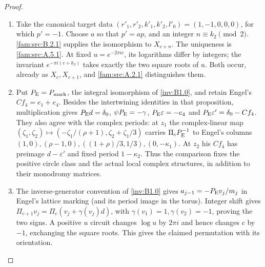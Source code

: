 \begin{proof}
\begin{enumerate}[label=\arabic*.,leftmargin=*]
\item Take the canonical target data $(r'_1,r'_2,k'_1,k'_2,l'_0)=(1,-1,0,0,0)$, for which $p'=-1$. Choose $a$ so that $p'=ap$, and an integer $n\equiv k_2\pmod2$. \ref{fam:src:B.2.1} supplies the isomorphism to $X_{c+n}$. The uniqueness is \ref{fam:src:A.5.1}. At fixed $u=e^{-2\pi ic}$, its logarithms differ by integers; the invariant $e^{-\pi i(c+k_2)}$ takes exactly the two square roots of $u$. Both occur, already as $X_c,X_{c+1}$, and \ref{fam:src:A.2.1} distinguishes them.

\item Put $P_{\rm E}=P_{\rm mark}$, the integral isomorphism of
\cref{inv:B1.0}, and retain Engel's $Cf_4=e_1+e_4$.
Besides the intertwining identities in that proposition, multiplication gives
$P_{\rm E}d=\delta_0$, $\psi P_{\rm E}=-\gamma$,
$P_{\rm E}\varepsilon=-e_4$ and
$P_{\rm E}\varepsilon'=\delta_0-Cf_4$.
They also agree with the complex periods: at $z_1$ the complex-linear map
$(\zeta_1,\zeta_2)\mapsto(-\zeta_1/(\rho+1),\zeta_2+\zeta_1/3)$ carries $\Pi_cP_{\rm E}^{-1}$ to Engel's columns $(1,0),(\rho-1,0),((1+\rho)/3,1/3),(0,-\kappa_1)$. At $z_2$ his $Cf_4$ has preimage $d-\varepsilon'$ and fixed period $1-\kappa_2$. Thus the comparison fixes the positive circle class and the actual local complex structures, in addition to their monodromy matrices.

\item The inverse-generator convention of \cref{inv:B1.0} gives $a_{j-1}=-P_{\rm E}v_j/m_j$ in Engel's lattice marking (and its period image in the torus). Integer shift gives $\Pi_{c+1}v_j=\Pi_c(v_j+\gamma(v_j)d)$, with $\gamma(v_1)=1,\gamma(v_2)=-1$, proving the two signs. A positive $u$ circuit changes $\log u$ by $2\pi i$ and hence changes $c$ by $-1$, exchanging the square roots. This gives the claimed permutation with its orientation.
\end{enumerate}
\end{proof}